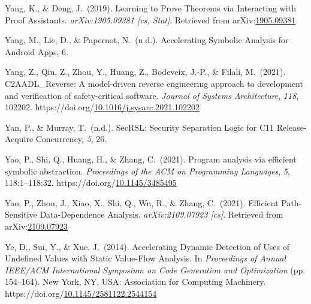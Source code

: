 \documentclass[12pt,twoside]{article}
\begin{document}
{\begin{thebibliography}{1079}
\mdbibitemlabel{}Yang, K., \& Deng, J.~(2019). Learning to Prove Theorems via Interacting with Proof Assistants. \emph{arXiv:1905.09381 {}[cs, Stat]}. Retrieved from arXiv:\href{http://arxiv.org/abs/1905.09381}{1905.09381}%

\mdbibitemlabel{}Yang, M., Lie, D., \& Papernot, N.~(n.d.). Accelerating Symbolic Analysis for Android Apps, 6.%

\mdbibitemlabel{}Yang, Z., Qiu, Z., Zhou, Y., Huang, Z., Bodeveix, J.-P., \& Filali, M.~(2021). C2AADL\_Reverse: A model-driven reverse engineering approach to development and verification of safety-critical software. \emph{Journal of Systems Architecture}, \emph{118}, 102202. https://doi.org/\href{https://dx.doi.org/10.1016/j.sysarc.2021.102202}{10.1016/j.sysarc.2021.102202}%

\mdbibitemlabel{}Yan, P., \& Murray, T.~(n.d.). SecRSL: Security Separation Logic for C11 Release-Acquire Concurrency, \emph{5}, 26.%

\mdbibitemlabel{}Yao, P., Shi, Q., Huang, H., \& Zhang, C.~(2021). Program analysis via efficient symbolic abstraction. \emph{Proceedings of the ACM on Programming Languages}, \emph{5}, 118:1–118:32. https://doi.org/\href{https://dx.doi.org/10.1145/3485495}{10.1145/3485495}%

\mdbibitemlabel{}Yao, P., Zhou, J., Xiao, X., Shi, Q., Wu, R., \& Zhang, C.~(2021). Efficient Path-Sensitive Data-Dependence Analysis. \emph{arXiv:2109.07923 {}[cs]}. Retrieved from arXiv:\href{http://arxiv.org/abs/2109.07923}{2109.07923}%

\mdbibitemlabel{}Ye, D., Sui, Y., \& Xue, J.~(2014). Accelerating Dynamic Detection of Uses of Undefined Values with Static Value-Flow Analysis. In \emph{Proceedings of Annual IEEE/ACM International Symposium on Code Generation and Optimization} (pp. 154–164). New York, NY, USA: Association for Computing Machinery. https://doi.org/\href{https://dx.doi.org/10.1145/2581122.2544154}{10.1145/2581122.2544154}%


\end{thebibliography}}
\end{document}
